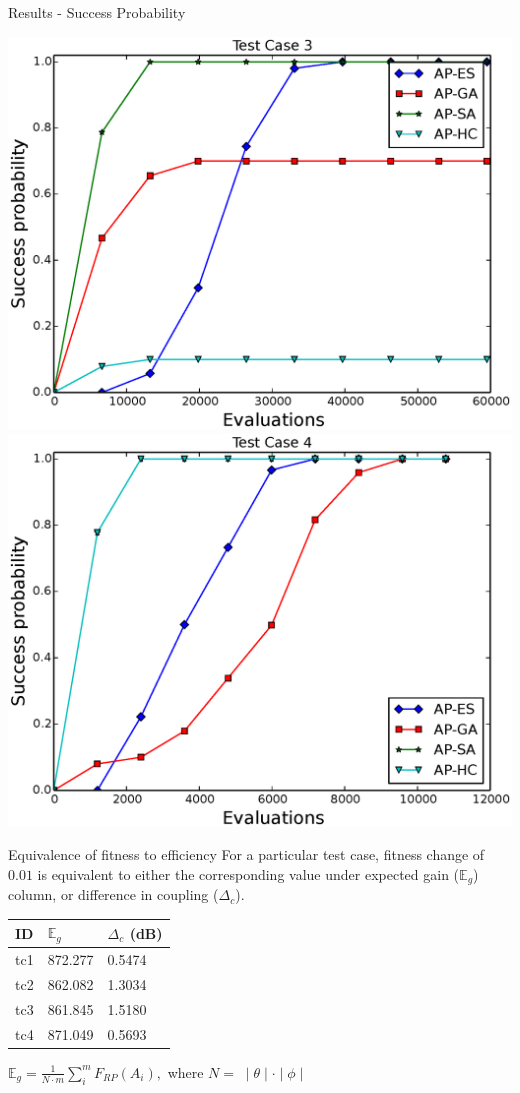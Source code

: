 \documentclass{beamer}
\begin{document}
        \begin{frame}{Results - Success Probability}
            \begin{center}
                \includegraphics[width=.49\textwidth]{../paper/FIG/tc3_sp.eps}
                \includegraphics[width=.49\textwidth]{../paper/FIG/tc4_sp.eps}
            \end{center}
        \end{frame}

        \begin{frame}{Equivalence of fitness to efficiency}
            \small For a particular test case, fitness change of $0.01$ is equivalent to either the corresponding value under expected gain ($\mathbb E_g$) column, or difference in coupling ($\Delta_c$).
            \begin{table}
                \centering
                \begin{threeparttable}
                    \begin{tabular}{|C{1cm}|C{2.5cm}|C{2.5cm}|} \hline
                        ID& $\mathbb E_g$ & $\Delta_{c}$ (dB) \\ \hline
                        tc1 & 872.277 & 0.5474 \\ \hline
                        tc2 & 862.082 & 1.3034 \\ \hline
                        tc3 & 861.845 & 1.5180 \\ \hline
                        tc4 & 871.049 & 0.5693 \\
                        \hline\end{tabular}
                \end{threeparttable}
            \end{table}
            \tiny
            $\mathbb E_g = \frac{1}{N \cdot m} \sum_{i}^m F_{RP}(A_i),$
            where $N = \;\mid \theta \mid \cdot \mid \phi \mid$
        \end{frame}
\end{document}
